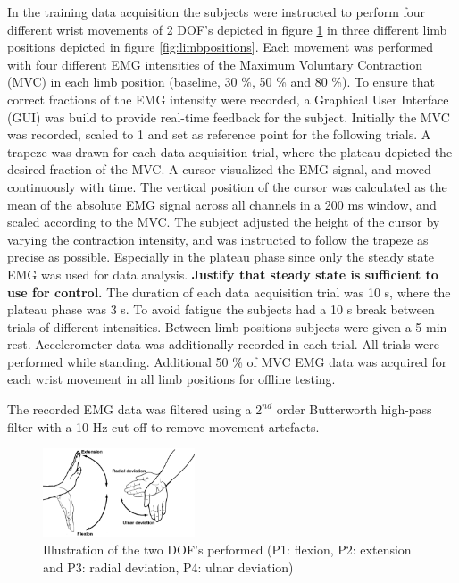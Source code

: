 In the training data acquisition the subjects were instructed to perform four different wrist movements of 2 DOF's depicted in figure \ref{fig:wristmovement} in three different limb positions depicted in figure \ref{fig:limbpositions}. Each movement was performed with four different EMG intensities of the Maximum Voluntary Contraction (MVC) in each limb position (baseline, 30 \%, 50 \% and 80 \%). To ensure that correct fractions of the EMG intensity were recorded, a Graphical User Interface (GUI) was build to provide real-time feedback for the subject. Initially the MVC was recorded, scaled to 1 and set as reference point for the following trials. A trapeze was drawn for each data acquisition trial, where the plateau depicted the desired fraction of the MVC. A cursor visualized the EMG signal, and moved continuously with time. The vertical position of the cursor was calculated as the mean of the absolute EMG signal across all channels in a 200 ms window, and scaled according to the MVC. The subject adjusted the height of the cursor by varying the contraction intensity, and was instructed to follow the trapeze as precise as possible. Especially in the plateau phase since only the steady state EMG was used for data analysis. \textbf{Justify that steady state is sufficient to use for control.} The duration of each data acquisition trial was 10 s, where the plateau phase was 3 s. To avoid fatigue the subjects had a 10 s break between trials of different intensities. Between limb positions subjects were given a 5 min rest. Accelerometer data was additionally recorded in each trial. All trials were performed while standing.
Additional 50 \% of MVC EMG data was acquired for each wrist movement in all limb positions for offline testing.

The recorded EMG data was filtered using a $2^{nd}$ order Butterworth high-pass filter with a 10 Hz cut-off to remove movement artefacts. 

\begin{figure}[thpb]
	\centering
	\includegraphics[width=0.4\textwidth]{Figures/wristmovement}  %
	\caption{Illustration of the two DOF's performed (P1: flexion, P2: extension and P3: radial deviation, P4: ulnar deviation)}
	\label{fig:wristmovement}  %
\end{figure}

